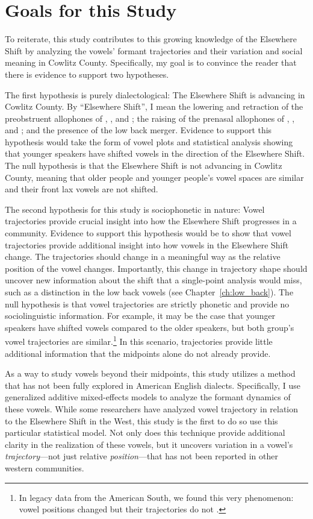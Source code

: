 \section{Goals for this Study}
\label{goals}

To reiterate, this study contributes to this growing knowledge of the Elsewhere Shift by analyzing the vowels' formant trajectories and their variation and social meaning in Cowlitz County. Specifically, my goal is to convince the reader that there is evidence to support two hypotheses.

The first hypothesis is purely dialectological: The Elsewhere Shift is advancing in Cowlitz County. By ``Elsewhere Shift'', I mean the lowering and retraction of the preobstruent allophones of \trap, \dress, and \kit; the raising of the prenasal allophones of \trap, \dress, and \kit; and the presence of the low back merger. Evidence to support this hypothesis would take the form of vowel plots and statistical analysis showing that younger speakers have shifted vowels in the direction of the Elsewhere Shift. The null hypothesis is that the Elsewhere Shift is not advancing in Cowlitz County, meaning that older people and younger people's vowel spaces are similar and their front lax vowels are not shifted.

The second hypothesis for this study is sociophonetic in nature: Vowel trajectories provide crucial insight into how the Elsewhere Shift progresses in a community. Evidence to support this hypothesis would be to show that vowel trajectories provide additional insight into how vowels in the Elsewhere Shift change. The trajectories should change in a meaningful way as the relative position of the vowel changes. Importantly, this change in trajectory shape should uncover new information about the shift that a single-point analysis would miss, such as a distinction in the low back vowels (see Chapter~\ref{ch:low_back}). The null hypothesis is that vowel trajectories are strictly phonetic and provide no sociolinguistic information. For example, it may be the case that younger speakers have shifted vowels compared to the older speakers, but both group's vowel trajectories are similar.\footnote{In legacy data from the American South, we found this very phenomenon: vowel positions changed but their trajectories do not \citep{stanley_renwick_2020_LSA_talk}.} In this scenario, trajectories provide little additional information that the midpoints alone do not already provide.

As a way to study vowels beyond their midpoints, this study utilizes a method that has not been fully explored in American English dialects. Specifically, I use generalized additive mixed-effects models \citep{wood_2017} to analyze the formant dynamics of these vowels. While some researchers have analyzed vowel trajectory in relation to the Elsewhere Shift in the West, this study is the first to do so use this particular statistical model. Not only does this technique provide additional clarity in the realization of these vowels, but it uncovers variation in a vowel's \textit{trajectory}---not just relative \textit{position}---that has not been reported in other western communities.

